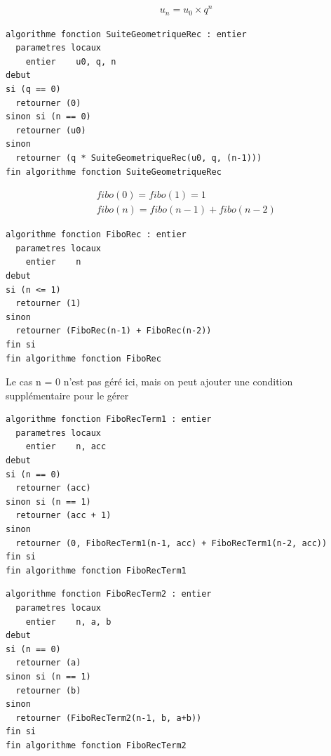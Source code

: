 \documentclass[11pt,a4paper]{article}
\begin{document}
\begin{equation*}
  \begin{aligned}
& u_{n} = u_{0} \times q^{n}
  \end{aligned}
\end{equation*}

\begin{lstlisting}[style=algorithmique]
algorithme fonction SuiteGeometriqueRec : entier
  parametres locaux
    entier    u0, q, n
debut
si (q == 0)
  retourner (0)
sinon si (n == 0)
  retourner (u0)
sinon
  retourner (q * SuiteGeometriqueRec(u0, q, (n-1)))
fin algorithme fonction SuiteGeometriqueRec \end{lstlisting}


\clearpage


\begin{equation*}
  \begin{aligned}
& fibo(0) = fibo(1) = 1 \\
& fibo(n) = fibo(n - 1) + fibo(n - 2)
  \end{aligned}
\end{equation*}

\begin{table}[ht!]
  \centering
\begin{lstlisting}[style=algorithmique]
algorithme fonction FiboRec : entier
  parametres locaux
    entier    n
debut
si (n <= 1)
  retourner (1)
sinon
  retourner (FiboRec(n-1) + FiboRec(n-2))
fin si
fin algorithme fonction FiboRec \end{lstlisting}
  \caption{Le cas n = 0 n'est pas géré ici, mais on peut ajouter une condition supplémentaire pour le gérer}
\end{table}


\begin{lstlisting}[style=algorithmique]
algorithme fonction FiboRecTerm1 : entier
  parametres locaux
    entier    n, acc
debut
si (n == 0)
  retourner (acc)
sinon si (n == 1)
  retourner (acc + 1)
sinon
  retourner (0, FiboRecTerm1(n-1, acc) + FiboRecTerm1(n-2, acc))
fin si
fin algorithme fonction FiboRecTerm1 \end{lstlisting}


\begin{lstlisting}[style=algorithmique]
algorithme fonction FiboRecTerm2 : entier
  parametres locaux
    entier    n, a, b
debut
si (n == 0)
  retourner (a)
sinon si (n == 1)
  retourner (b)
sinon
  retourner (FiboRecTerm2(n-1, b, a+b))
fin si
fin algorithme fonction FiboRecTerm2 \end{lstlisting}
\end{document}
